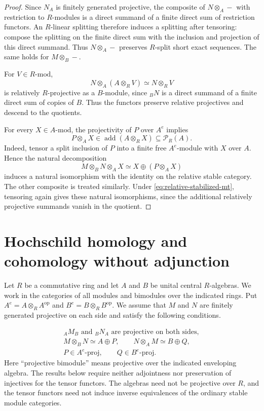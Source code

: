 \documentclass[12pt,a4paper,english,reqno]{amsart}
\numberwithin{equation}{section}
\theoremstyle{plain}
\theoremstyle{definition}
\begin{document}
\begin{proof}
Since $N_A$ is finitely generated projective, the composite of
$N\otimes_A-$ with restriction to $R$-modules is a direct summand
of a finite direct sum of restriction functors.  An $R$-linear
splitting therefore induces a splitting after tensoring: compose
the splitting on the finite direct sum with the inclusion and
projection of this direct summand.  Thus $N\otimes_A-$ preserves
$R$-split short exact sequences.  The same holds for $M\otimes_B-$.

For $V\in R\text{-}\mathrm{mod}$,
\[
 N\otimes_A(A\otimes_RV)\simeq N\otimes_RV
\]
is relatively $R$-projective as a $B$-module, since ${}_BN$ is a
direct summand of a finite direct sum of copies of $B$.  Thus the
functors preserve relative projectives and descend to the
quotients.

For every $X\in A\text{-}\mathrm{mod}$, the projectivity of $P$
over $A^e$ implies
\[
 P\otimes_AX\in
   \operatorname{add}(A\otimes_RX)\subseteq\mathcal P_R(A).
\]
Indeed, tensor a split inclusion of $P$ into a finite free
$A^e$-module with $X$ over $A$.  Hence the natural decomposition
\[
 M\otimes_BN\otimes_AX\simeq X\oplus(P\otimes_AX)
\]
induces a natural isomorphism with the identity on the relative
stable category.  The other composite is treated similarly.
Under \eqref{eq:relative-stabilized-mt}, tensoring again gives
these natural isomorphisms, since the additional relatively
projective summands vanish in the quotient.
\end{proof}

\section{Hochschild homology and cohomology without adjunction}
\label{sec:hochschild-without-adjunction}

Let $R$ be a commutative ring and let $A$ and $B$ be unital
central $R$-algebras. We work in the categories of all modules and
bimodules over the indicated rings. Put
$A^e=A\otimes_R A^{\mathrm{op}}$ and $B^e=B\otimes_R B^{\mathrm{op}}$.
We assume that $M$ and $N$ are finitely generated projective on
each side and satisfy the following conditions.

\begin{equation}
\begin{gathered}
 {}_AM_B\text{ and }{}_BN_A\text{ are projective on both sides},\\
 M\otimes_B N\simeq A\oplus P,
 \qquad N\otimes_A M\simeq B\oplus Q,\\
 P\in A^e\text{-}\mathrm{proj},
 \qquad Q\in B^e\text{-}\mathrm{proj}.
\end{gathered}
\tag{HH-MT}\label{eq:hh-mt}
\end{equation}
Here ``projective bimodule'' means projective over the indicated
enveloping algebra.  The results below require neither adjointness nor
preservation of injectives for the tensor functors.  The algebras need
not be projective over $R$, and the tensor functors need not induce
inverse equivalences of the ordinary stable module categories.
\end{document}
